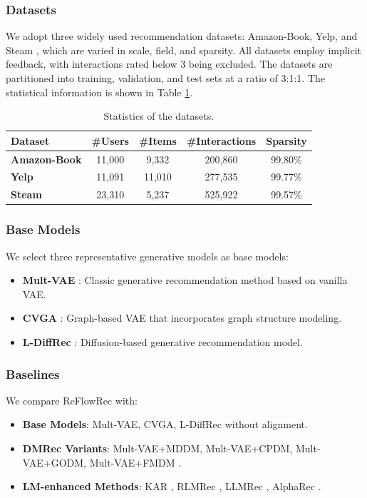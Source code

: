 \documentclass[sigconf]{acmart}
\begin{document}
\subsubsection{\textbf{Datasets}} 
We adopt three widely used recommendation datasets: Amazon-Book, Yelp, and Steam \cite{ren2024representation}, which are varied in scale, field, and sparsity. All datasets employ implicit feedback, with interactions rated below 3 being excluded. The datasets are partitioned into training, validation, and test sets at a ratio of 3:1:1. The statistical information is shown in Table \ref{dataset}.

\begin{table}[t]
\small
\setlength{\abovecaptionskip}{0.1cm}
\setlength{\belowcaptionskip}{0.1cm} 
  \caption{Statistics of the datasets.}
  \label{dataset}
  \begin{tabular}{l|c|c|c|c}
    \hline
    \textbf{Dataset}&\textbf{\#Users}&\textbf{\#Items}&\textbf{\#Interactions}&\textbf{Sparsity}\\
    \hline
    \hline
    \textbf{Amazon-Book}&11,000&9,332&200,860&99.80\%\\
    \textbf{Yelp}&11,091&11,010&277,535&99.77\%\\
    \textbf{Steam}&23,310&5,237&525,922&99.57\%\\
    \hline
  \end{tabular}
\end{table}

\subsubsection{\textbf{Base Models}}
We select three representative generative models as base models:
\begin{itemize}[leftmargin=*]
    \item \textbf{Mult-VAE} \cite{liang2018variational}: Classic generative recommendation method based on vanilla VAE.
    \item \textbf{CVGA} \cite{zhang2023revisiting}: Graph-based VAE that incorporates graph structure modeling.
    \item \textbf{L-DiffRec} \cite{wang2023diffusion}: Diffusion-based generative recommendation model.
\end{itemize}

\subsubsection{\textbf{Baselines}}
We compare \textsf{ReFlowRec} with:
\begin{itemize}[leftmargin=*]
    \item \textbf{Base Models}: Mult-VAE, CVGA, L-DiffRec without alignment.
    \item \textbf{DMRec Variants}: Mult-VAE+MDDM, Mult-VAE+CPDM, Mult-VAE+GODM, Mult-VAE+FMDM \cite{zhang2024dmrec}.
    \item \textbf{LM-enhanced Methods}: KAR \cite{xi2024towards}, RLMRec \cite{ren2024representation}, LLMRec \cite{wei2024llmrec}, AlphaRec \cite{sheng2024language}.
\end{itemize}
\end{document}
